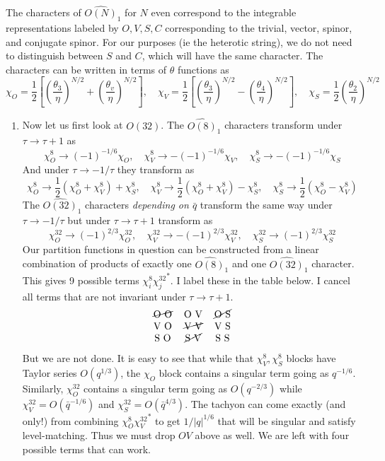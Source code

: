 \documentclass[11pt, class=article, crop=false]{standalone}
\begin{document}
\begin{enumerate}
	The characters of $\widehat{O(N)}_1$ for $N$ even correspond to the integrable representations labeled by $O, V, S, C$ corresponding to the trivial, vector, spinor, and conjugate spinor. For our purposes (ie the heterotic string), we do not need to distinguish between $S$ and $C$, which will have the same character. The characters can be written in terms of $\theta$ functions as
	\[
		\chi_O = \frac12 \left[\left(\frac{\theta_3}{\eta}\right)^{N/2} + \left(\frac{\theta_v}{\eta}\right)^{N/2} \right], \quad
		\chi_V = \frac12 \left[\left(\frac{\theta_3}{\eta}\right)^{N/2} - \left(\frac{\theta_4}{\eta}\right)^{N/2} \right], \quad
		\chi_S = \frac12 \left(\frac{\theta_2}{\eta}\right)^{N/2}
	\]
	\begin{enumerate}
		\item 	Now let us first look at $O(32)$. 
	The $\widehat{O(8)}_1$ characters transform under $\tau \to \tau+1$ as 
	\[
		\chi_O^8 \to (-1)^{-1/6} \chi_O, \quad \chi_V^8 \to - (-1)^{-1/6} \chi_V, \quad \chi_S^8 \to - (-1)^{-1/6} \chi_S
	\]
	And under $\tau \to -1/\tau$ they transform as
	\[
			\chi_O^8 \to \frac12 (\chi_O^8 + \chi_V^8) + \chi_S^8, 
			\quad \chi_V^8 \to \frac12 (\chi_O^8 + \chi_V^8) - \chi_S^8,
			\quad \chi_S^8 \to \frac12 (\chi_O^8 - \chi_V^8)
	\]
	The $\widehat{O(32)}_1$ characters \emph{depending on $\bar q$} transform the same way under $\tau \to -1/\tau$ but under $\tau \to \tau + 1$ transform as
	\[
		\chi_O^{32} \to (-1)^{2/3} \chi_O^{32}, \quad \chi_V^{32} \to - (-1)^{2/3} \chi_V^{32}, \quad \chi_S^{32} \to (-1)^{2/3} \chi_S^{32}
	\]
	Our partition functions in question can be constructed from a linear combination of products of exactly one $\widehat{O(8)}_1$ and one $\widehat{O(32)}_1$ character. This gives 9 possible terms $\chi_i^8 {\chi^{32}_j}^*$. I label these in the table below. I cancel all terms that are not invariant under $\tau \to \tau + 1$. 
	\[
		\begin{tabular}{c c c}
			\cancel{O O} & O V & \cancel{O S}\\
			V O & \cancel{V V} & V S\\
			S O & \cancel{S V} & S S
		\end{tabular}
	\]
	But we are not done. It is easy to see that while that $\chi_V^8, \chi_S^8$ blocks have Taylor series $O(q^{1/3})$, the $\chi_O$ block contains a singular term going as $q^{-1/6}$. Similarly, $\chi_O^{32}$ contains a singular term going as $O(q^{-2/3})$ while $\chi_V^{32} = O(\bar q^{-1/6})$ and $\chi_{S}^{32} = O(\bar q^{4/3})$. The tachyon can come exactly (and only!) from combining $\chi_O^{8} {\chi_V^{32}}^*$ to get $1/|q|^{1/6}$ that will be singular and satisfy level-matching. Thus we must drop $O V$ above as well. We are left with four possible terms that can work. 
	

\end{enumerate}
\end{enumerate}
\end{document}
